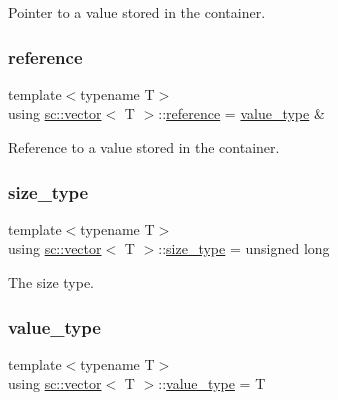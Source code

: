 Pointer to a value stored in the container. 

\mbox{\label{classsc_1_1vector_a37394c8a6b82c4a0709737d7982e32b2}} 
\subsubsection{\texorpdfstring{reference}{reference}}
{\footnotesize\ttfamily template$<$typename T$>$ \\
using \hyperlink{classsc_1_1vector}{sc\+::vector}$<$ T $>$\+::\hyperlink{classsc_1_1vector_a37394c8a6b82c4a0709737d7982e32b2}{reference} =  \hyperlink{classsc_1_1vector_ad37f5bfa688e43c420ed565e4bff6fac}{value\+\_\+type} \&}



Reference to a value stored in the container. 

\mbox{\label{classsc_1_1vector_a48bf37ba1a6d0c13504414d86e27c399}} 
\subsubsection{\texorpdfstring{size\+\_\+type}{size\_type}}
{\footnotesize\ttfamily template$<$typename T$>$ \\
using \hyperlink{classsc_1_1vector}{sc\+::vector}$<$ T $>$\+::\hyperlink{classsc_1_1vector_a48bf37ba1a6d0c13504414d86e27c399}{size\+\_\+type} =  unsigned long}



The size type. 

\mbox{\label{classsc_1_1vector_ad37f5bfa688e43c420ed565e4bff6fac}} 
\subsubsection{\texorpdfstring{value\+\_\+type}{value\_type}}
{\footnotesize\ttfamily template$<$typename T$>$ \\
using \hyperlink{classsc_1_1vector}{sc\+::vector}$<$ T $>$\+::\hyperlink{classsc_1_1vector_ad37f5bfa688e43c420ed565e4bff6fac}{value\+\_\+type} =  T}



